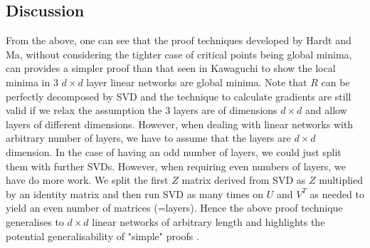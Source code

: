 \documentclass[12pt]{article}
\begin{document}
\subsection*{Discussion}
From the above, one can see that the proof techniques developed by Hardt and Ma, without considering the tighter case of critical points being global minima, can provides a simpler proof than that seen in Kawaguchi \cite{kawaguchi2016deep} to show the local minima in 3 $d \times d$ layer linear networks are global minima. Note that $R$ can be perfectly decomposed by SVD and the technique to calculate gradients are still valid if we relax the assumption the 3 layers are of dimensions $d \times d$ and allow layers of different dimensions. However, when dealing with linear networks with arbitrary number of layers, we have to assume that the layers are $d \times d$ dimension. In the case of having an odd number of layers, we could just split them with further SVDs. However, when requiring even numbers of layers, we have do more work. We split the first $Z$ matrix derived from SVD as $Z$ multiplied by an identity matrix and then run SVD as many times on $U$ and $V^T$ as needed to yield an even number of matrices (=layers). Hence the above proof technique generalises to $d \times d$ linear networks of arbitrary length and highlights the potential generalisability of "simple" proofs \cite{ge2016matrix}.



\end{document}
